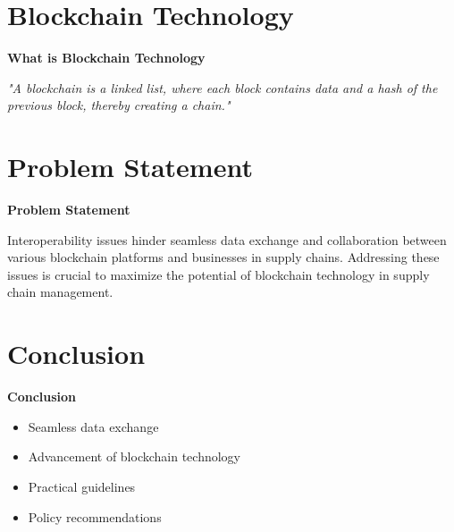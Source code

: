 \documentclass{beamer}
\begin{document}
\section{Blockchain Technology}
\begin{frame}
\textbf{\Large What is Blockchain Technology}

\vspace{0.5cm}
\textit{"A blockchain is a linked list, where each block contains data and a hash of the previous block, thereby creating a chain."}
\end{frame}

\section{Problem Statement}
\begin{frame}
\textbf{\Large Problem Statement}

\vspace{0.5cm}
Interoperability issues hinder seamless data exchange and collaboration between various blockchain platforms and businesses in supply chains. Addressing these issues is crucial to maximize the potential of blockchain technology in supply chain management.
\end{frame}

\section{Conclusion}
\begin{frame}
\textbf{\Large Conclusion}

\vspace{0.5cm}
\begin{itemize}
    \item Seamless data exchange
    \item Advancement of blockchain technology
    \item Practical guidelines
    \item Policy recommendations
\end{itemize}
\end{frame}
\end{document}
